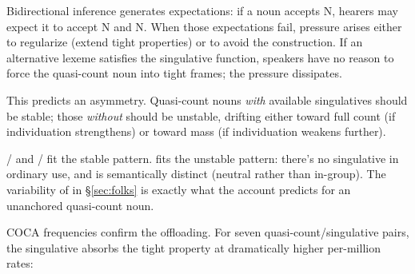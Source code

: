 \documentclass[12pt,a4paper]{article}
\begin{document}
Bidirectional inference generates expectations: if a noun accepts  N, hearers may expect it to accept  N and  N. When those expectations fail, pressure arises either to regularize (extend tight properties) or to avoid the construction. If an alternative lexeme satisfies the singulative function, speakers have no reason to force the quasi-count noun into tight frames; the pressure dissipates.

This predicts an asymmetry. Quasi-count nouns \textit{with} available singulatives should be stable; those \textit{without} should be unstable, drifting either toward full count (if individuation strengthens) or toward mass (if individuation weakens further).

/ and / fit the stable pattern.  fits the unstable pattern: there's no singulative  in ordinary use, and  is semantically distinct (neutral rather than in-group). The variability of  in \S\ref{sec:folks} is exactly what the account predicts for an unanchored quasi-count noun.

COCA frequencies confirm the offloading. For seven quasi-count/singulative pairs, the singulative absorbs the tight property at dramatically higher per-million rates:
\end{document}

